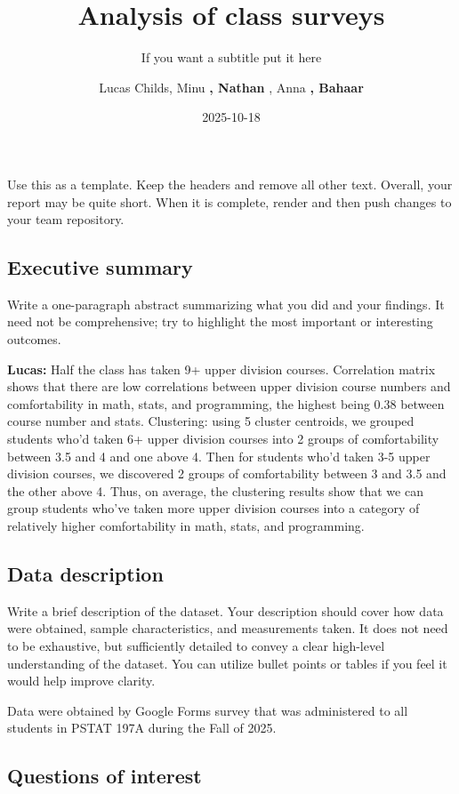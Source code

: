 \documentclass[
  letterpaper,
  DIV=11,
  numbers=noendperiod]{scrartcl}
\title{Analysis of class surveys}
\subtitle{If you want a subtitle put it here}
\author{Lucas Childs, Minu \textbf{, Nathan }, Anna \textbf{, Bahaar }}
\date{2025-10-18}
\begin{document}
\maketitle


Use this as a template. Keep the headers and remove all other text.
Overall, your report may be quite short. When it is complete, render and
then push changes to your team repository.

\subsection{Executive summary}\label{executive-summary}

Write a one-paragraph abstract summarizing what you did and your
findings. It need not be comprehensive; try to highlight the most
important or interesting outcomes.

\textbf{Lucas:} Half the class has taken 9+ upper division courses.
Correlation matrix shows that there are low correlations between upper
division course numbers and comfortability in math, stats, and
programming, the highest being 0.38 between course number and stats.
Clustering: using 5 cluster centroids, we grouped students who'd taken
6+ upper division courses into 2 groups of comfortability between 3.5
and 4 and one above 4. Then for students who'd taken 3-5 upper division
courses, we discovered 2 groups of comfortability between 3 and 3.5 and
the other above 4. Thus, on average, the clustering results show that we
can group students who've taken more upper division courses into a
category of relatively higher comfortability in math, stats, and
programming.

\subsection{Data description}\label{data-description}

Write a brief description of the dataset. Your description should cover
how data were obtained, sample characteristics, and measurements taken.
It does not need to be exhaustive, but sufficiently detailed to convey a
clear high-level understanding of the dataset. You can utilize bullet
points or tables if you feel it would help improve clarity.

Data were obtained by Google Forms survey that was administered to all
students in PSTAT 197A during the Fall of 2025.

\subsection{Questions of interest}\label{questions-of-interest}
\end{document}
